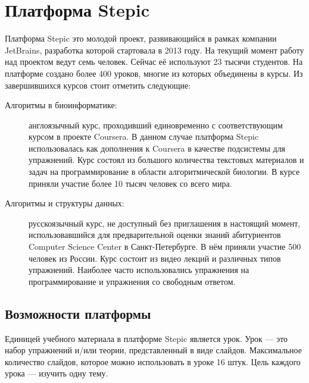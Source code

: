 \documentclass{matmex-diploma-custom}
\begin{document}
\section{Платформа Stepic}

Платформа Stepic \cite{stepic} это молодой проект, развивающийся в
рамках компании JetBrains, разработка которой стартовала в 2013
году. На текущий момент работу над проектом ведут семь человек. Сейчас
её используют 23 тысячи студентов. На платформе создано более 400
уроков, многие из которых объединены в курсы. Из завершившихся курсов
стоит отметить следующие:

\begin{description}
\item[Алгоритмы в биоинформатике:] англоязычный курс, проходивший
  единовременно с соответствующим курсом в проекте Coursera. В данном
  случае платформа Stepic использовалась как дополнения к Coursera в качестве
  подсистемы для упражнений. Курс состоял из большого количества
  текстовых материалов и задач на программирование в области
  алгоритмической биологии. В курсе приняли участие более 10 тысяч
  человек со всего мира.

\item[Алгоритмы и структуры данных:] русскоязычный курс, не доступный
  без приглашения в настоящий момент, использовавшийся для
  предварительной оценки знаний абитуриентов Computer Science Center в
  Санкт-Петербурге. В нём приняли участие 500 человек из России. Курс
  состоит из видео лекций и различных типов упражнений. Наиболее часто
  использовались упражнения на программирование и упражнения со
  свободным ответом.
\end{description}

\subsection{Возможности платформы}
Единицей учебного материала в платформе Stepic является урок. Урок ---
это набор упражнений и/или теории, представленный в виде
слайдов. Максимальное количество слайдов, которое можно использовать в
уроке 16 штук. Цель каждого урока --- изучить одну тему.
\end{document}
